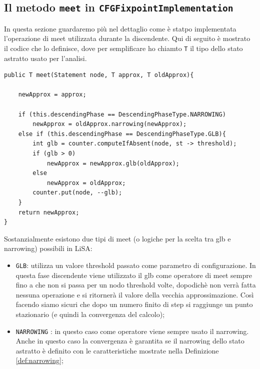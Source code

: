 \subsection{Il metodo \texttt{meet} in \texttt{CFGFixpointImplementation}}
In questa sezione guardaremo più nel dettaglio come è statpo implementata l'operazione di meet utilizzata durante la discendente. Qui di seguito è mostrato il codice che lo definisce, dove per semplificare ho chiamto \texttt{T} il tipo dello stato astratto usato per l'analisi.  
\begin{lstlisting}[belowskip=-1.1 \baselineskip, escapechar=|]
public T meet(Statement node, T approx, T oldApprox){

    newApprox = approx;
    
    if (this.descendingPhase == DescendingPhaseType.NARROWING)
        newApprox = oldApprox.narrowing(newApprox);
    else if (this.descendingPhase == DescendingPhaseType.GLB){
        int glb = counter.computeIfAbsent(node, st -> threshold);
        if (glb > 0) 
            newApprox = newApprox.glb(oldApprox);
        else
            newApprox = oldApprox;
        counter.put(node, --glb);
    }
    return newApprox;
}
\end{lstlisting}
Sostanzialmente esistono due tipi di meet (o logiche per la scelta tra glb e narrowing) possibili in LiSA:
\begin{itemize}
\itemsep0pt
    \item \texttt{GLB}: utilizza un valore threshold passato come parametro di configurazione. In questa fase discendente viene utilizzato il glb come operatore di meet sempre fino a che non si passa per un nodo threshold volte, dopodichè non verrà fatta nessuna operazione e si ritornerà il valore della vecchia approssimazione. Così facendo siamo sicuri che dopo un numero finito di step si raggiunge un punto stazionario (e quindi la convergenza del calcolo);
    \item \texttt{NARROWING} : in questo caso come operatore viene sempre usato il narrowing. Anche in questo caso la convergenza è garantita se il narrowing dello stato astratto è definito con le caratteristiche mostrate nella Definizione \ref{def:narrowing};
\end{itemize}

